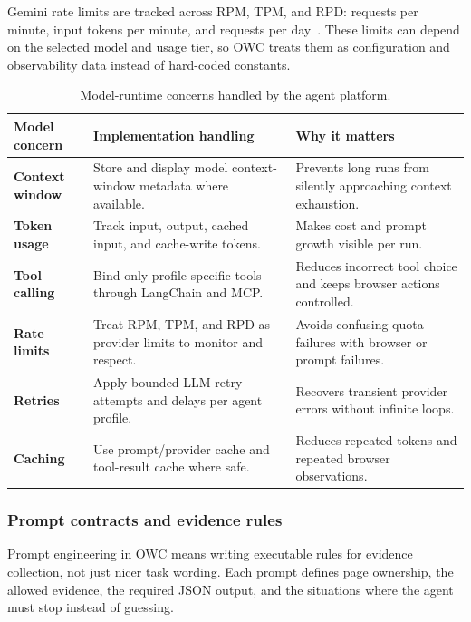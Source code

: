 Gemini rate limits are tracked across RPM, TPM, and RPD: requests per minute, input
tokens per minute, and requests per day~\cite{gemini-rate-limits}. These limits can
depend on the selected model and usage tier, so OWC treats them as configuration and
observability data instead of hard-coded constants.

\begin{table}[!htbp]\centering
\begin{tabularx}{\textwidth}{>{\raggedright\arraybackslash\bfseries}p{3.1cm}
                              >{\raggedright\arraybackslash}X
                              >{\raggedright\arraybackslash}X}
\toprule
\rowcolor{accent!8}
Model concern & Implementation handling & Why it matters \\
\midrule
Context window & Store and display model context-window metadata where available.
& Prevents long runs from silently approaching context exhaustion. \\
Token usage & Track input, output, cached input, and cache-write tokens. & Makes
cost and prompt growth visible per run. \\
Tool calling & Bind only profile-specific tools through LangChain and MCP\@. &
Reduces incorrect tool choice and keeps browser actions controlled. \\
Rate limits & Treat RPM, TPM, and RPD as provider limits to monitor and respect.
& Avoids confusing quota failures with browser or prompt failures. \\
Retries & Apply bounded LLM retry attempts and delays per agent profile. &
Recovers transient provider errors without infinite loops. \\
Caching & Use prompt/provider cache and tool-result cache where safe. & Reduces
repeated tokens and repeated browser observations. \\
\bottomrule
\end{tabularx}
\caption{Model-runtime concerns handled by the agent platform.}\label{tab:model-runtime-concerns}
\end{table}

\subsubsection{Prompt contracts and evidence rules}

Prompt engineering in OWC means writing executable rules for evidence collection, not
just nicer task wording. Each prompt defines page ownership, the allowed evidence, the
required JSON output, and the situations where the agent must stop instead of guessing.

